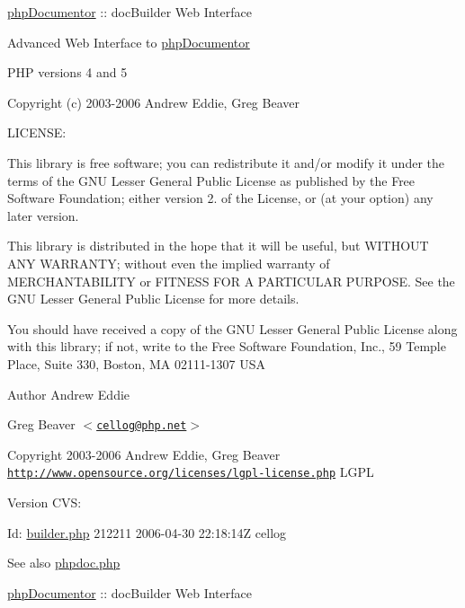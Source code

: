 \hyperlink{namespacephp_documentor}{php\-Documentor} \-:\-: doc\-Builder \-Web \-Interface

\-Advanced \-Web \-Interface to \hyperlink{namespacephp_documentor}{php\-Documentor}

\-P\-H\-P versions 4 and 5

\-Copyright (c) 2003-\/2006 \-Andrew \-Eddie, \-Greg \-Beaver

\-L\-I\-C\-E\-N\-S\-E\-:

\-This library is free software; you can redistribute it and/or modify it under the terms of the \-G\-N\-U \-Lesser \-General \-Public \-License as published by the \-Free \-Software \-Foundation; either version 2. of the \-License, or (at your option) any later version.

\-This library is distributed in the hope that it will be useful, but \-W\-I\-T\-H\-O\-U\-T \-A\-N\-Y \-W\-A\-R\-R\-A\-N\-T\-Y; without even the implied warranty of \-M\-E\-R\-C\-H\-A\-N\-T\-A\-B\-I\-L\-I\-T\-Y or \-F\-I\-T\-N\-E\-S\-S \-F\-O\-R \-A \-P\-A\-R\-T\-I\-C\-U\-L\-A\-R \-P\-U\-R\-P\-O\-S\-E. \-See the \-G\-N\-U \-Lesser \-General \-Public \-License for more details.

\-You should have received a copy of the \-G\-N\-U \-Lesser \-General \-Public \-License along with this library; if not, write to the \-Free \-Software \-Foundation, \-Inc., 59 \-Temple \-Place, \-Suite 330, \-Boston, \-M\-A 02111-\/1307 \-U\-S\-A

\begin{DoxyAuthor}{\-Author}
\-Andrew \-Eddie 

\-Greg \-Beaver $<$\href{mailto:cellog@php.net}{\tt cellog@php.\-net}$>$ 
\end{DoxyAuthor}
\begin{DoxyCopyright}{\-Copyright}
2003-\/2006 \-Andrew \-Eddie, \-Greg \-Beaver  \href{http://www.opensource.org/licenses/lgpl-license.php}{\tt http\-://www.\-opensource.\-org/licenses/lgpl-\/license.\-php} \-L\-G\-P\-L 
\end{DoxyCopyright}
\begin{DoxyVersion}{\-Version}
\-C\-V\-S\-: 
\end{DoxyVersion}
\begin{DoxyParagraph}{\-Id\-:}
\hyperlink{builder_8php}{builder.\-php} 212211 2006-\/04-\/30 22\-:18\-:14\-Z cellog 
\end{DoxyParagraph}
\begin{DoxySeeAlso}{\-See also}
\hyperlink{phpdoc_8php}{phpdoc.\-php}
\end{DoxySeeAlso}
\hyperlink{namespacephp_documentor}{php\-Documentor} \-:\-: doc\-Builder \-Web \-Interface

